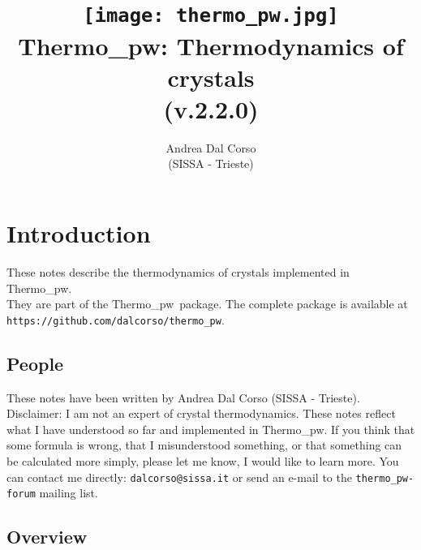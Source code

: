 \documentclass[12pt,a4paper,twoside]{report}
\def\version{2.2.0}
\def\tpw{{\sc Thermo}\_{\sc pw}}
\begin{document}
 

\author{Andrea Dal Corso \\ (SISSA - Trieste)}
\date{}

\title{
  \texttt{[image: thermo\_pw.jpg]} \\
  \vspace{3truecm}
  \Huge \color{dark-blue} {\sc Thermo\_pw}: Thermodynamics of crystals \\(v.\version)
}

\maketitle

\newpage

{\color{dark-blue}\tableofcontents}
\color{black}

\newpage

{\color{dark-blue}\chapter{Introduction}}
\color{black}

These notes describe the thermodynamics of crystals implemented in \tpw. \\
They are part of the \tpw\ package. The complete package is
available at \texttt{https://github.com/dalcorso/thermo\_pw}.

\newpage
{\color{coral}\section{People}}
\color{black}

These notes have been written by Andrea Dal Corso (SISSA - Trieste). \\
Disclaimer: I am not an expert of crystal thermodynamics. 
These notes reflect what I have understood so far and implemented in 
\tpw. If you think that some formula is wrong, 
that I misunderstood something, or that something can be calculated more 
simply, please let me know, I would like to learn more. 
You can contact me directly: \texttt{dalcorso@sissa.it} or send an
e-mail to the \texttt{thermo\_pw-forum} mailing list.

\newpage
{\color{coral}\section{Overview}}
\color{black}
\end{document}
